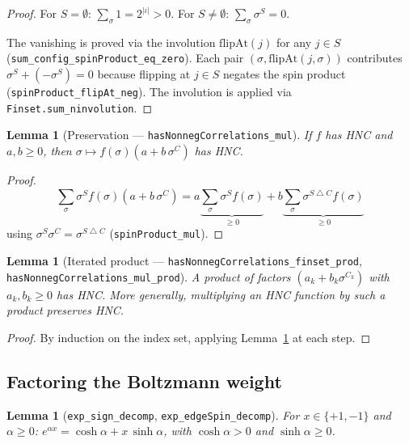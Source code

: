\documentclass[a4paper,11pt]{article}
\newtheorem{lemma}[theorem]{Lemma}
\begin{document}
\begin{proof}
For $S = \emptyset$: $\sum_\sigma 1 = 2^{|\iota|} > 0$.
For $S \neq \emptyset$: $\sum_\sigma \sigma^S = 0$.

The vanishing is proved via the involution
$\mathrm{flipAt}(j)$ for any $j \in S$
(\texttt{sum\_config\_spinProduct\_eq\_zero}).
Each pair $(\sigma, \mathrm{flipAt}(j, \sigma))$ contributes
$\sigma^S + (-\sigma^S) = 0$ because flipping at $j \in S$ negates
the spin product (\texttt{spinProduct\_flipAt\_neg}).
The involution is applied via \texttt{Finset.sum\_ninvolution}.
\end{proof}

\begin{lemma}[Preservation --- \texttt{hasNonnegCorrelations\_mul}]
\label{lem:mul}
If $f$ has HNC and $a, b \geq 0$, then
$\sigma \mapsto f(\sigma)(a + b\,\sigma^C)$ has HNC.
\end{lemma}

\begin{proof}
\[
  \sum_\sigma \sigma^S f(\sigma)(a + b\,\sigma^C)
  = a \underbrace{\sum_\sigma \sigma^S f(\sigma)}_{\geq 0}
  + b \underbrace{\sum_\sigma \sigma^{S \bigtriangleup C} f(\sigma)}_{\geq 0}
\]
using $\sigma^S \sigma^C = \sigma^{S \bigtriangleup C}$
(\texttt{spinProduct\_mul}).
\end{proof}

\begin{lemma}[Iterated product --- \texttt{hasNonnegCorrelations\_finset\_prod},
\texttt{hasNonnegCorrelations\_mul\_prod}]
A product of factors $(a_k + b_k \sigma^{C_k})$ with $a_k, b_k \geq 0$
has HNC. More generally, multiplying an HNC function by such a product
preserves HNC.
\end{lemma}

\begin{proof}
By induction on the index set, applying Lemma~\ref{lem:mul} at each step.
\end{proof}

\subsection{Factoring the Boltzmann weight}

\begin{lemma}[\texttt{exp\_sign\_decomp}, \texttt{exp\_edgeSpin\_decomp}]
For $x \in \{+1, -1\}$ and $\alpha \geq 0$:
$e^{\alpha x} = \cosh\alpha + x\,\sinh\alpha$,
with $\cosh\alpha > 0$ and $\sinh\alpha \geq 0$.
\end{lemma}
\end{document}
